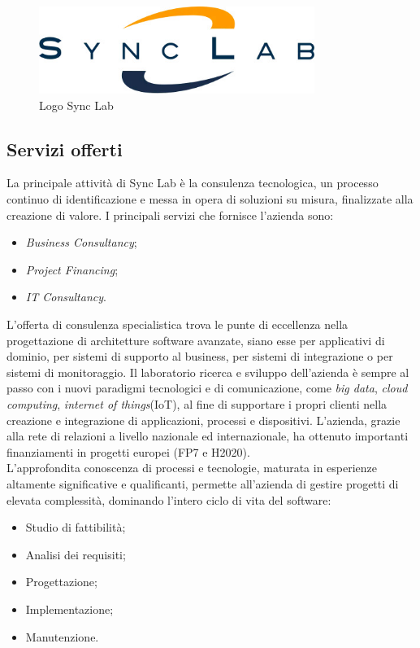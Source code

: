 \begin{figure}[h]
\caption{Logo Sync Lab}
\centering
\includegraphics[width=0.8\textwidth]{./immagini/logo-synclab.jpg}
\end{figure}

\subsection{Servizi offerti}
La principale attività di Sync Lab è la consulenza tecnologica, un processo continuo di identificazione e messa in opera di soluzioni su misura, finalizzate alla creazione di valore. I principali servizi che fornisce l'azienda sono:
\begin{itemize}
	\item{\textit{Business Consultancy};}
	\item{\textit{Project Financing};}
	\item{\textit{IT Consultancy}.}
\end{itemize}
L’offerta di consulenza specialistica trova le punte di eccellenza nella progettazione di
architetture software avanzate, siano esse per applicativi di dominio, per sistemi di supporto
al business, per sistemi di integrazione o per sistemi di monitoraggio. Il laboratorio ricerca e sviluppo dell’azienda è sempre al passo con
i nuovi paradigmi tecnologici e di comunicazione, come \emph{\gls{big data}}\glsfirstoccur, \emph{\gls{cloud computing}}\glsfirstoccur,
\emph{\gls{internet of things}}\glsfirstoccur (IoT), al fine di supportare i propri clienti nella creazione
e integrazione di applicazioni, processi e dispositivi. 
L’azienda, grazie alla rete di relazioni a livello nazionale ed internazionale, ha ottenuto
importanti finanziamenti in progetti europei (FP7 e H2020).\\
L’approfondita conoscenza di processi e tecnologie, maturata in esperienze altamente
significative e qualificanti, permette all'azienda di gestire progetti di
elevata complessità, dominando l’intero ciclo di vita del software:
\begin{itemize}
	\item{Studio di fattibilità;}
	\item{Analisi dei requisiti;}
	\item{Progettazione;}
	\item{Implementazione;}
	\item{Manutenzione.}
\end{itemize}

